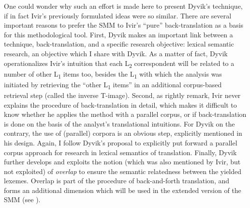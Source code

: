 One could wonder why such an effort is made here to present Dyvik’s technique, if in fact Ivir’s previously formulated ideas were so similar. There are several important reasons to prefer the SMM to Ivir’s ``pure'' back-translation as a basis for this methodological tool. First, Dyvik makes an important link between a technique, back-translation, and a specific research objective: lexical semantic research, an objective which I share with Dyvik. As a matter of fact, Dyvik operationalizes Ivir’s intuition that each L\textsubscript{2} correspondent will be related to a number of other L\textsubscript{1} items too, besides the L\textsubscript{1} with which the analysis was initiated \citep[478]{dirven_functionalism_1987} by retrieving the “other L\textsubscript{1} items” in an additional corpus-based retrieval step (called the inverse T-image). Second, as \citet[25]{ebeling_patterns_2013} rightly remark, Ivir never explains the procedure of back-translation in detail, which makes it difficult to know whether he applies the method with a parallel corpus, or if back-translation is done on the basis of the analyst’s translational intuitions. For Dyvik on the contrary, the use of (parallel) corpora is an obvious step, explicitly mentioned in his design. Again, I follow Dyvik’s proposal to explicitly put forward a parallel corpus approach for research in lexical semantics of translation. Finally, Dyvik further develops and exploits the notion (which was also mentioned by Ivir, but not exploited) of \textit{overlap} to ensure the semantic relatedness between the yielded lexemes. Overlap is part of the procedure of back-and-forth translation, and forms an additional dimension which will be used in the extended version of the SMM (see ).

